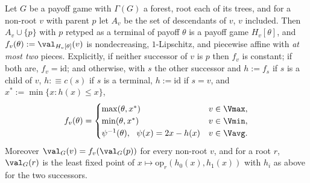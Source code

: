 \begin{lemma}\label{wa:forest-response}
Let $G$ be a payoff game with $\Gamma(G)$ a forest, root each of its trees, and
for a non-root $v$ with parent $p$ let $A_v$ be the set of descendants of $v$,
$v$ included. Then $A_v\cup\{p\}$ with $p$ retyped as a terminal of payoff
$\theta$ is a payoff game $H_v[\theta]$, and
$f_v(\theta):=\val_{H_v[\theta]}(v)$ is nondecreasing, $1$-Lipschitz, and
piecewise affine with \emph{at most two} pieces. Explicitly, if neither
successor of $v$ is $p$ then $f_v$ is constant; if both are, $f_v=\mathrm{id}$;
and otherwise, with $s$ the other successor and
$h:=f_s$ if $s$ is a child of $v$, $h:\equiv c(s)$ if $s$ is a terminal,
$h:=\mathrm{id}$ if $s=v$, and $x^{\ast}:=\min\{x:h(x)\le x\}$,
\[
  f_v(\theta)=\begin{cases}
    \max(\theta,x^{\ast}) & v\in\Vmax,\\
    \min(\theta,x^{\ast}) & v\in\Vmin,\\
    \psi^{-1}(\theta),\ \ \psi(x)=2x-h(x) & v\in\Vavg .
  \end{cases}
\]
Moreover $\val_G(v)=f_v(\val_G(p))$ for every non-root $v$, and for a root $r$,
$\val_G(r)$ is the least fixed point of $x\mapsto\mathrm{op}_r(h_0(x),h_1(x))$
with $h_i$ as above for the two successors.
\end{lemma}

